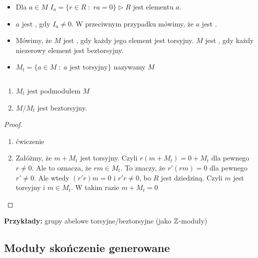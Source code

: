 \begin{definition}$ $

  \begin{itemize}
    \item[\PHtunny] Dla $a\in M$ $I_a=\{r\in R\;:\;ra=0\}\triangleright R$ jest  elementu $a$.
    \item[\PHtunny] $a$ jest , gdy $I_a\neq 0$. W przeciwnym przypadku mówimy, że $a$ jest .
    \item[\PHtunny] Mówimy, że $M$ jest , gdy każdy jego element jest torsyjny. $M$ jest , gdy każdy niezerowy element jest beztorsyjny.
    \item[\PHtunny] $M_t=\{a\in M\;:\;a\text{ jest torsyjny}\}$ nazywamy  $M$
  \end{itemize}
\end{definition}

\begin{remark}$ $

  \begin{enumerate}
    \item $M_t$ jest podmodułem $M$
    \item $M/M_t$ jest beztorsyjny.
  \end{enumerate}
\end{remark}
\begin{proof}$ $

  \begin{enumerate}
    \item ćwiczenie
    \item Załóżmy, że $m+M_t$ jest torsyjny. Czyli $r(m+M_t)=0+M_t$ dla pewnego $r\neq 0$. Ale to oznacza, że $rm\in M_t$. To znaczy, że $r'(rm)=0$ dla pewnego $r'\neq 0$. Ale wtedy $(r'r)m=0$ i $r'r\neq 0$, bo $R$ jest dziedziną. Czyli $m$ jest torsyjny i $m\in M_t$. W takim razie $m+M_t=0$ 
  \end{enumerate}
\end{proof}

\textbf{Przykłady:} grupy abelowe torsyjne/beztorsyjne (jako $\mathbb{Z}$-moduły)

\subsection{Moduły skończenie generowane}

